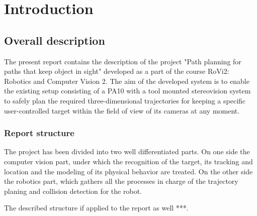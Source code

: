 
\chapter{Introduction}
\label{chap:introduction}

\section{Overall description}
The present report contains the description of the  project "Path planning for paths that keep
object in sight" developed as a part of the course RoVi2: Robotics and Computer Vision 2. 
The aim of the developed system is to enable the existing setup consisting of a PA10 with a tool mounted stereovision system to safely plan the required three-dimensional trajectories for keeping a specific user-controlled target within the field of view of its cameras at any moment. 

\subsection{Report structure}
The project has been divided into two well differentiated parts. On one side the computer vision part, under which the recognition of the target, its tracking and location and the modeling of its physical behavior are treated. On the other side the robotics part, which gathers all the processes in charge of the trajectory planing and collision detection for the robot.

The described structure if applied to the report as well ***.